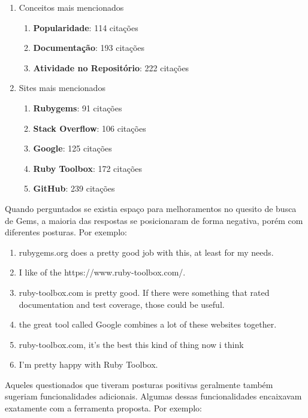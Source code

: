 \begin{enumerate}
	\item Conceitos mais mencionados
	    \begin{enumerate}
	        \item \textbf{Popularidade}: 114 citações
			\item \textbf{Documentação}: 193 citações    	
    		\item \textbf{Atividade no Repositório}: 222 citações
        \end{enumerate}
   	\item Sites mais mencionados
      	\begin{enumerate}
        	\item \textbf{Rubygems}: 91 citações
            \item \textbf{Stack Overflow}: 106 citações
		    \item \textbf{Google}: 125 citações
		    \item \textbf{Ruby Toolbox}: 172 citações
            \item \textbf{GitHub}: 239 citações
	    \end{enumerate}
\end{enumerate}

Quando perguntados se existia espaço para melhoramentos no quesito de busca de Gems, a maioria das respostas se posicionaram de forma negativa, porém com diferentes posturas. Por exemplo:

\begin{enumerate}
	\item rubygems.org does a pretty good job with this, at least for my needs.
    \item I like of the https://www.ruby-toolbox.com/.
    \item ruby-toolbox.com is pretty good. If there were something that rated documentation and test coverage, those could be useful.
    \item the great tool called Google combines a lot of these websites together.
    \item ruby-toolbox.com, it's the best this kind of thing now i think
    \item I'm pretty happy with Ruby Toolbox.
\end{enumerate}

Aqueles questionados que tiveram posturas positivas geralmente também sugeriam funcionalidades adicionais. Algumas dessas funcionalidades encaixavam exatamente com a ferramenta proposta. Por exemplo:

